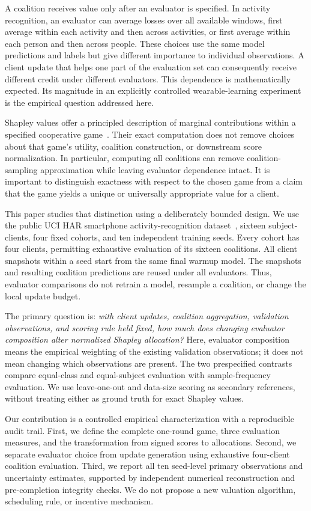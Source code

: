 \documentclass[conference,letterpaper]{IEEEtran}
\begin{document}
A coalition receives value only after an evaluator is specified. In activity recognition, an evaluator can average losses over all available windows, first average within each activity and then across activities, or first average within each person and then across people. These choices use the same model predictions and labels but give different importance to individual observations. A client update that helps one part of the evaluation set can consequently receive different credit under different evaluators. This dependence is mathematically expected. Its magnitude in an explicitly controlled wearable-learning experiment is the empirical question addressed here.

Shapley values offer a principled description of marginal contributions within a specified cooperative game~\cite{shapley}. Their exact computation does not remove choices about that game's utility, coalition construction, or downstream score normalization. In particular, computing all coalitions can remove coalition-sampling approximation while leaving evaluator dependence intact. It is important to distinguish exactness with respect to the chosen game from a claim that the game yields a unique or universally appropriate value for a client.

This paper studies that distinction using a deliberately bounded design. We use the public UCI HAR smartphone activity-recognition dataset~\cite{har,uci}, sixteen subject-clients, four fixed cohorts, and ten independent training seeds. Every cohort has four clients, permitting exhaustive evaluation of its sixteen coalitions. All client snapshots within a seed start from the same final warmup model. The snapshots and resulting coalition predictions are reused under all evaluators. Thus, evaluator comparisons do not retrain a model, resample a coalition, or change the local update budget.

The primary question is: \emph{with client updates, coalition aggregation, validation observations, and scoring rule held fixed, how much does changing evaluator composition alter normalized Shapley allocation?} Here, evaluator composition means the empirical weighting of the existing validation observations; it does not mean changing which observations are present. The two prespecified contrasts compare equal-class and equal-subject evaluation with sample-frequency evaluation. We use leave-one-out and data-size scoring as secondary references, without treating either as ground truth for exact Shapley values.

Our contribution is a controlled empirical characterization with a reproducible audit trail. First, we define the complete one-round game, three evaluation measures, and the transformation from signed scores to allocations. Second, we separate evaluator choice from update generation using exhaustive four-client coalition evaluation. Third, we report all ten seed-level primary observations and uncertainty estimates, supported by independent numerical reconstruction and pre-completion integrity checks. We do not propose a new valuation algorithm, scheduling rule, or incentive mechanism.
\end{document}
